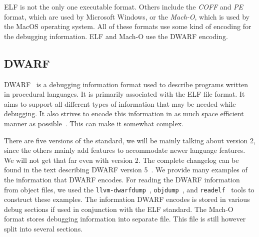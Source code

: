 ELF is not the only one executable format. Others include the \textit{COFF} and
\textit{PE} format, which are used by Microsoft Windows, or the
\textit{Mach-O}, which is used by the MacOS operating system. All of these
formats use some kind of encoding for the debugging information. ELF and Mach-O
use the DWARF encoding.

\subsection{DWARF}
DWARF~\cite{dwarf} is a debugging information format used to describe programs
written in procedural languages. It is primarily associated with the ELF file
format. It aims to support all different types of information that may be
needed while debugging. It also strives to encode this information in as much
space efficient manner as possible~\cite{dwarf}. This can make it somewhat
complex. 

There are five versions of the standard, we will be mainly talking about
version 2, since the others mainly add features to accommodate newer language
features. We will not get that far even with version 2. The complete changelog
can be found in the text describing DWARF version 5~\cite{dwarf-5}. We provide
many examples of the information that DWARF encodes. For reading the DWARF
information from object files, we used the
\texttt{llvm-dwarfdump}~\cite{dwarfdump}, \texttt{objdump}~\cite{objdump}, and
\texttt{readelf}~\cite{readelf} tools to construct these examples. The
information DWARF encodes is stored in various debug sections if used in
conjunction with the ELF standard. The Mach-O format stores debugging
information into separate file. This file is still however split into several
sections.

